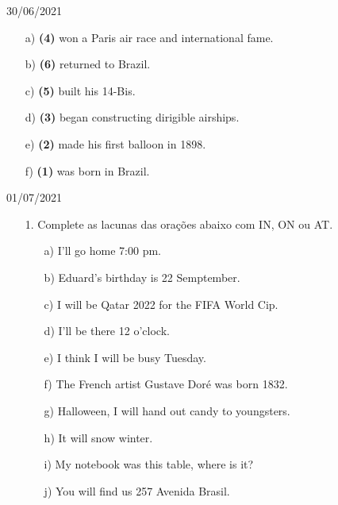 \documentclass{SchoolBook}
\begin{document}
\begin{day}{30/06/2021}
\begin{enumerate}
            \begin{enumerate}[nosep]
                \item[a)] \textbf{(4)} won a Paris air race and international fame.
                \item[b)] \textbf{(6)} returned to Brazil.
                \item[c)] \textbf{(5)} built his 14-Bis.
                \item[d)] \textbf{(3)} began constructing dirigible airships.
                \item[e)] \textbf{(2)} made his first balloon in 1898.
                \item[f)] \textbf{(1)} was born in Brazil.
            \end{enumerate}
        \end{enumerate}
    \end{day}
    
    \begin{day}{01/07/2021}
        \begin{enumerate}
            \item[1.] Complete as lacunas das orações abaixo com IN, ON ou AT.
            \begin{enumerate}
                \item[a)] I'll go home  7:00 pm.
                \item[b)] Eduard's birthday is  22 Semptember.
                \item[c)] I will be  Qatar  2022 for the FIFA World Cip.
                \item[d)] I'll be there  12 o'clock.
                \item[e)] I think I will be busy  Tuesday.
                \item[f)] The French artist Gustave Doré was born  1832.
                \item[g)]  Halloween, I will hand out candy to youngsters.
                \item[h)] It will snow  winter.
                \item[i)] My notebook was  this table, where is it?
                \item[j)] You will find us  257 Avenida Brasil.
            \end{enumerate}
        \end{enumerate}
    \end{day}
\end{document}
